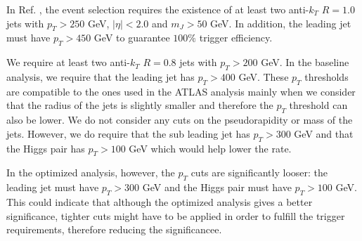 In Ref. \cite{hh2bbbbATLAS1}, the event selection requires the existence of at least two anti-$k_T$ $R=1.0$ jets with $p_T>250$ GeV, $|\eta|<2.0$ and $m_J>50$ GeV. In addition, the leading jet must have $p_T>450$ GeV to guarantee $100\%$ trigger efficiency. 

We require at least two anti-$k_T$ $R=0.8$ jets with $p_T>200$ GeV. In the baseline analysis, we require that the leading jet has $p_T>400$ GeV. These $p_T$ thresholds are compatible to the ones used in the ATLAS analysis mainly when we consider that the radius of the jets is slightly smaller and therefore the $p_T$ threshold can also be lower. We do not consider any cuts on the pseudorapidity or mass of the jets. However, we do require that the sub leading jet has $p_T>300$ GeV and that the Higgs pair has $p_T>100$ GeV which would help lower the rate. 

In the optimized analysis, however, the $p_T$ cuts are significantly looser: the leading jet must have $p_T>300$ GeV and the Higgs pair must have $p_T>100$ GeV. This could indicate that although the optimized analysis gives a better significance, tighter cuts might have to be applied in order to fulfill the trigger requirements, therefore reducing the significancee.

